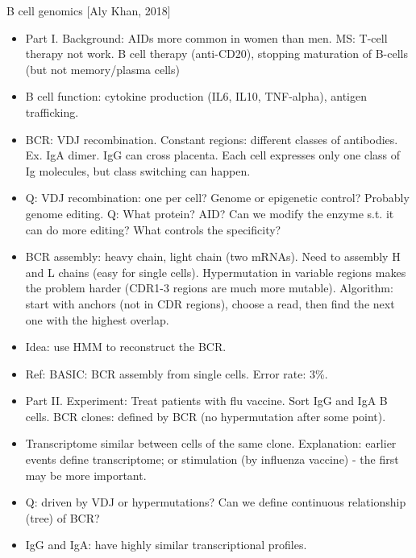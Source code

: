 \documentclass{report}
\begin{document}
B cell genomics [Aly Khan, 2018]
\begin{itemize}
	\item Part I. Background: AIDs more common in women than men. MS: T-cell therapy not work. B cell therapy (anti-CD20), stopping maturation of B-cells (but not memory/plasma cells)
	
	\item B cell function: cytokine production (IL6, IL10, TNF-alpha), antigen trafficking.
	
	\item BCR: VDJ recombination. Constant regions: different classes of antibodies. Ex. IgA dimer. IgG can cross placenta. Each cell expresses only one class of Ig molecules, but class switching can happen.
	
	\item Q: VDJ recombination: one per cell? Genome or epigenetic control? Probably genome editing. Q: What protein? AID? Can we modify the enzyme s.t. it can do more editing? What controls the specificity?
	
	\item BCR assembly: heavy chain, light chain (two mRNAs). Need to assembly H and L chains (easy for single cells). Hypermutation in variable regions makes the problem harder (CDR1-3 regions are much more mutable). Algorithm: start with anchors (not in CDR regions), choose a read, then find the next one with the highest overlap.
	
	\item Idea: use HMM to reconstruct the BCR.
	
	\item Ref: BASIC: BCR assembly from single cells. Error rate: 3\%.
	
	\item Part II. Experiment: Treat patients with flu vaccine. Sort IgG and IgA B cells. BCR clones: defined by BCR (no hypermutation after some point).
	
	\item Transcriptome similar between cells of the same clone. Explanation: earlier events define transcriptome; or stimulation (by influenza vaccine) - the first may be more important.
	
	\item Q: driven by VDJ or hypermutations? Can we define continuous relationship (tree) of BCR?
	
	\item IgG and IgA: have highly similar transcriptional profiles.
	

\end{itemize}
\end{document}
